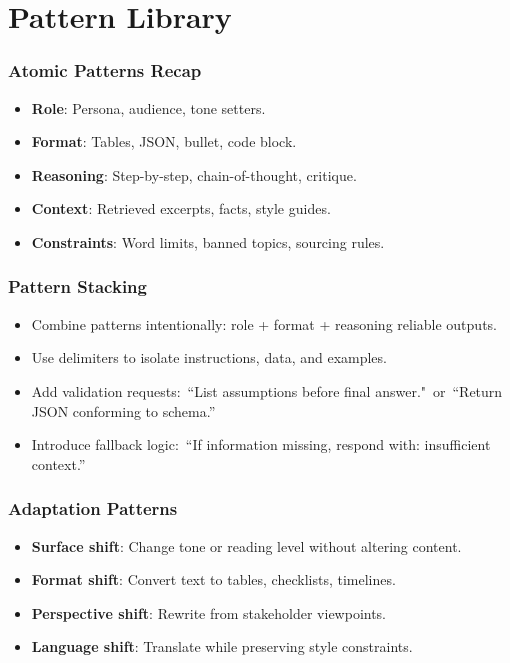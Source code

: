 \documentclass{beamer}
\begin{document}
\section{Pattern Library}

\begin{frame}
    \frametitle{Atomic Patterns Recap}
    \begin{itemize}
        \item \textbf{Role}: Persona, audience, tone setters.
        \item \textbf{Format}: Tables, JSON, bullet, code block.
        \item \textbf{Reasoning}: Step-by-step, chain-of-thought, critique.
        \item \textbf{Context}: Retrieved excerpts, facts, style guides.
        \item \textbf{Constraints}: Word limits, banned topics, sourcing rules.
    \end{itemize}
\end{frame}

\begin{frame}
    \frametitle{Pattern Stacking}
    \begin{itemize}
        \item Combine patterns intentionally: role + format + reasoning \textrightarrow{} reliable outputs.
        \item Use delimiters to isolate instructions, data, and examples.
        \item Add validation requests:\ ``List assumptions before final answer."\ or\ ``Return JSON conforming to schema.''
        \item Introduce fallback logic:\ ``If information missing, respond with: insufficient context.''
    \end{itemize}
\end{frame}

\begin{frame}
    \frametitle{Adaptation Patterns}
    \begin{itemize}
        \item \textbf{Surface shift}: Change tone or reading level without altering content.
        \item \textbf{Format shift}: Convert text to tables, checklists, timelines.
        \item \textbf{Perspective shift}: Rewrite from stakeholder viewpoints.
        \item \textbf{Language shift}: Translate while preserving style constraints.
    \end{itemize}
\end{frame}
\end{document}
